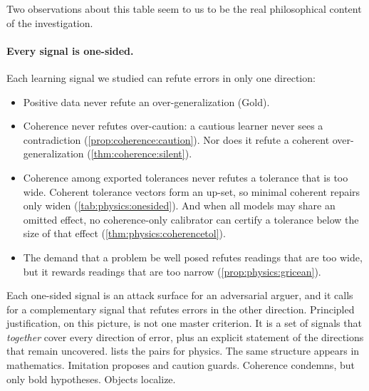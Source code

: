 Two observations about this table seem to us to be the real philosophical content of the investigation.

\paragraph{Every signal is one-sided.}
Each learning signal we studied can refute errors in only one direction:
\begin{itemize}
\item Positive data never refute an over-generalization (Gold).
\item Coherence never refutes over-caution: a cautious learner never sees a contradiction (\cref{prop:coherence:caution}). Nor does it refute a coherent over-generalization (\cref{thm:coherence:silent}).
\item Coherence among exported tolerances never refutes a tolerance that is too wide. Coherent tolerance vectors form an up-set, so minimal coherent repairs only widen (\cref{tab:physics:onesided}). And when all models may share an omitted effect, no coherence-only calibrator can certify a tolerance below the size of that effect (\cref{thm:physics:coherencetol}).
\item The demand that a problem be well posed refutes readings that are too wide, but it rewards readings that are too narrow (\cref{prop:physics:gricean}).
\end{itemize}
Each one-sided signal is an attack surface for an adversarial arguer, and it calls for a complementary signal that refutes errors in the other direction. Principled justification, on this picture, is not one master criterion. It is a set of signals that \emph{together} cover every direction of error, plus an explicit statement of the directions that remain uncovered.  lists the pairs for physics. The same structure appears in mathematics. Imitation proposes and caution guards. Coherence condemns, but only bold hypotheses. Objects localize.

